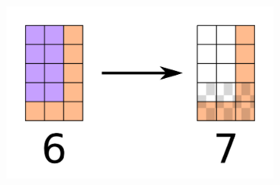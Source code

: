 \begin{solution}
\begin{center}
	\includegraphics[width=9cm]{28/figs/28_diagram3.png}
\end{center}

\end{solution}